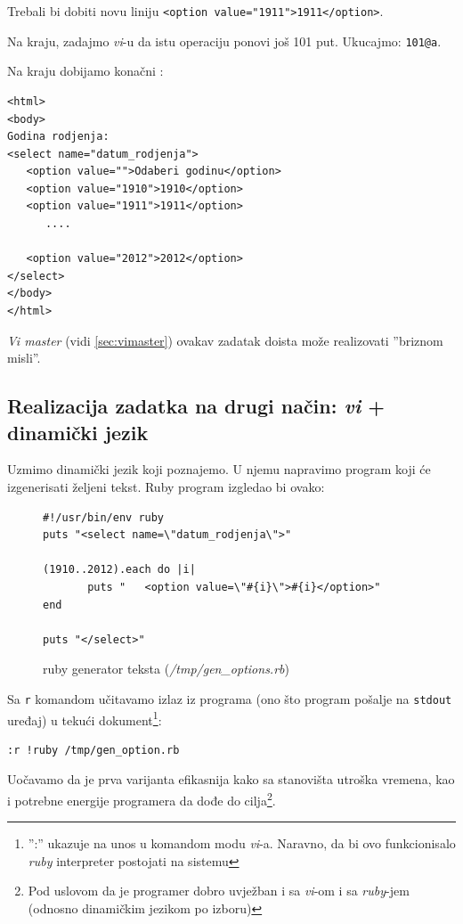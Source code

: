 \documentclass[times, utf8, seminar]{fit}
\begin{document}
Trebali bi dobiti novu liniju \verb+<option value="1911">1911</option>+. 

Na kraju, zadajmo \emph{vi}-u da istu operaciju ponovi još 101 put. Ukucajmo: \verb+101@a+. 

Na kraju dobijamo konačni \href{https://gist.github.com/4412263}{\color{blue}{rezultat}}:

\begin{lstlisting}
<html>
<body>
Godina rodjenja:
<select name="datum_rodjenja">
   <option value="">Odaberi godinu</option>
   <option value="1910">1910</option>
   <option value="1911">1911</option>
      ....

   <option value="2012">2012</option>
</select>
</body>
</html>
\end{lstlisting}

\emph{Vi master} (vidi \ref{sec:vimaster}) ovakav zadatak doista može realizovati ''briznom misli''.

\subsection{Realizacija zadatka na drugi način: \emph{vi} + dinamički jezik}

Uzmimo dinamički jezik koji poznajemo. U njemu napravimo program koji će izgenerisati željeni tekst. Ruby program izgledao bi ovako:

\begin{figure}[H]
\begin{lstlisting}
#!/usr/bin/env ruby
puts "<select name=\"datum_rodjenja\">"

(1910..2012).each do |i|
       puts "   <option value=\"#{i}\">#{i}</option>"	
end

puts "</select>"
\end{lstlisting}
\caption{ruby generator teksta (\emph{/tmp/gen\_options.rb})}
\end{figure}

Sa \verb+r+ komandom učitavamo izlaz iz programa (ono što program pošalje na \verb+stdout+ uređaj) u tekući dokument\footnote{'':'' ukazuje na unos u komandom modu \emph{vi}-a.  Naravno, da bi ovo funkcionisalo \emph{ruby} interpreter postojati na sistemu}:

\begin{lstlisting}
:r !ruby /tmp/gen_option.rb
\end{lstlisting}

Uočavamo da je prva varijanta efikasnija kako sa stanovišta utroška vremena, kao i potrebne energije programera da dođe do cilja\footnote{Pod uslovom da je programer dobro uvježban i sa \emph{vi}-om i sa \emph{ruby}-jem (odnosno dinamičkim jezikom po izboru)}.
\end{document}
